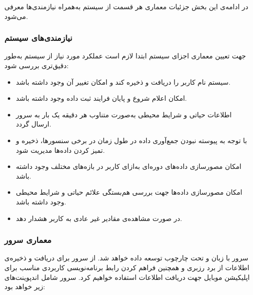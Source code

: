\documentclass[12pt]{article}
\begin{document}
در ادامه‌ی این بخش جزئیات معماری هر قسمت از سیستم به‌همراه نیازمندی‌ها معرفی می‌شود.

\subsubsection{نیازمندی‌های سیستم}
جهت تعیین معماری اجزای سیستم ابتدا لازم است عملکرد مورد نیاز از سیستم به‌طور دقیق‌تری بررسی شود:
\begin{itemize}
	\item سیستم نام کاربر را دریافت و ذخیره کند و امکان تغییر آن وجود داشته باشد.
	\item امکان اعلام شروع و پایان فرایند ثبت داده وجود داشته باشد.
	\item اطلاعات حیاتی و شرایط محیطی به‌صورت متناوب هر دقیقه یک بار به سرور ارسال گردد.
	\item با توجه به پیوسته نبودن جمع‌آوری داده در طول زمان در برخی سنسورها، ذخیره و تمیز کردن داده‌ها مدیریت شود.
	\item امکان مصورسازی داده‌های دوره‌ای به‌ازای کاربر در بازه‌های مختلف وجود داشته باشد.
	\item امکان مصورسازی داده‌ها جهت بررسی هم‌بستگی علائم حیاتی و شرایط محیطی وجود داشته باشد.
	\item در صورت مشاهده‌ی مقادیر غیر عادی به کاربر هشدار دهد.
\end{itemize}

\subsubsection{معماری سرور}
سرور با زبان  و تحت چارچوب  توسعه داده خواهد شد. از سرور برای دریافت و ذخیره‌ی اطلاعات از برد رزبری و همچنین فراهم کردن رابط برنامه‌نویسی کاربردی  مناسب برای اپلیکیشن موبایل جهت دریافت اطلاعات استفاده خواهیم کرد.  سرور شامل اندپوینت‌های زیر خواهد بود:
\end{document}
